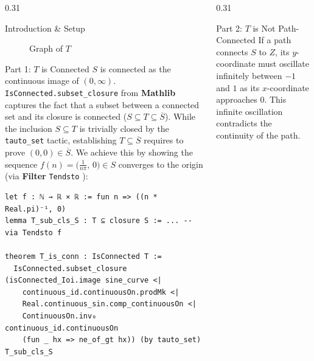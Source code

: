 \documentclass{beamer}
\begin{document}
\begin{frame}[t,fragile]
\begin{columns}[t]
\begin{column}{0.31\textwidth}
\begin{block}{Introduction \& Setup}
\begin{figure}
                    \caption{Graph of $T$}
                \end{figure}
            \end{block}

            \begin{block}{Part 1: $T$ is Connected}
                $S$ is connected as the continuous image of $(0,\infty)$.
                \texttt{IsConnected.subset\_closure} from \textbf{Mathlib} captures the fact that a subset between a connected set and its closure is connected
                ($S \subseteq T \subseteq \overline{S}$).
                While the inclusion $S \subseteq T$ is trivially closed by the \texttt{tauto\_set} tactic,
                establishing $T \subseteq \overline{S}$ requires to prove $(0,0) \in \overline{S}$.
                We achieve this by showing the sequence
                $f(n) = \bigl(\tfrac{1}{n\pi},\, 0\bigr) \in S$ converges to the origin (via \textbf{Filter} \texttt{Tendsto} ):

                \begin{lstlisting}
let f : ℕ → ℝ × ℝ := fun n => ((n * Real.pi)⁻¹, 0)
lemma T_sub_cls_S : T ⊆ closure S := ... -- via Tendsto f

theorem T_is_conn : IsConnected T :=
  IsConnected.subset_closure (isConnected_Ioi.image sine_curve <|
    continuous_id.continuousOn.prodMk <|
    Real.continuous_sin.comp_continuousOn <|
    ContinuousOn.inv₀ continuous_id.continuousOn
    (fun _ hx => ne_of_gt hx)) (by tauto_set) T_sub_cls_S
    \end{lstlisting}
            \end{block}
        \end{column}

        \begin{column}{0.31\textwidth}
            \begin{block}{Part 2: $T$ is Not Path-Connected}
                If a path connects $S$ to $Z$, its $y$-coordinate
                must oscillate infinitely between $-1$ and $1$ as its $x$-coordinate approaches $0$.
                This infinite oscillation contradicts the continuity of the path.


\end{block}
\end{column}
\end{columns}
\end{frame}
\end{document}
